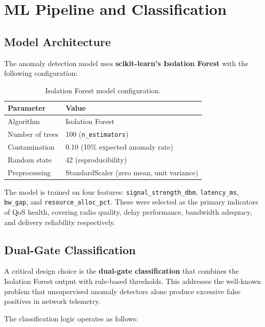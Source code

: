 \documentclass[11pt, a4paper]{article}
\begin{document}
\section{ML Pipeline and Classification}

\subsection{Model Architecture}

The anomaly detection model uses \textbf{scikit-learn's Isolation Forest} with the following configuration:

\begin{table}[H]
\centering
\begin{tabular}{l l}
\toprule
\textbf{Parameter} & \textbf{Value} \\
\midrule
Algorithm         & Isolation Forest \\
Number of trees   & 100 (\texttt{n\_estimators}) \\
Contamination     & 0.10 (10\% expected anomaly rate) \\
Random state      & 42 (reproducibility) \\
Preprocessing     & StandardScaler (zero mean, unit variance) \\
\bottomrule
\end{tabular}
\caption{Isolation Forest model configuration.}
\label{tab:model}
\end{table}

The model is trained on four features: \texttt{signal\_strength\_dbm}, \texttt{latency\_ms}, \texttt{bw\_gap}, and \texttt{resource\_alloc\_pct}. These were selected as the primary indicators of QoS health, covering radio quality, delay performance, bandwidth adequacy, and delivery reliability respectively.

\subsection{Dual-Gate Classification}

A critical design choice is the \textbf{dual-gate classification} that combines the Isolation Forest output with rule-based thresholds. This addresses the well-known problem that unsupervised anomaly detectors alone produce excessive false positives in network telemetry.

The classification logic operates as follows:
\end{document}
